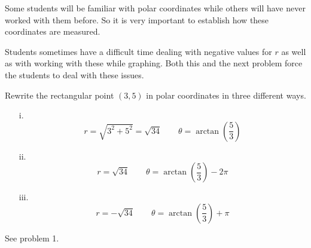 \documentclass[]{ximera}
\begin{document}
\begin{instructorNotes}
Some students will be familiar with polar coordinates while others will have never worked with them before.  
So it is very important to establish how these coordinates are measured.

Students sometimes have a difficult time dealing with negative values for $r$ as well as with working with these while graphing.  
Both this and the next problem force the students to deal with these issues.  
\end{instructorNotes}







\begin{problem}
Rewrite the rectangular point $(3,5)$ in polar coordinates in three different ways.
	\begin{freeResponse}
	\begin{enumerate}
	\item[i.]
		\[
		r = \sqrt{3^2 + 5^2} = \sqrt{34}	\qquad	\theta = \arctan \left( \frac{5}{3} \right)
		\]
		
	
	\item[ii.]
		\[
		r = \sqrt{34} 	\qquad	\theta = \arctan \left( \frac{5}{3} \right) - 2 \pi
		\]
		
	
	\item[iii.]
		\[
		r = - \sqrt{34}	\qquad	\theta = \arctan \left( \frac{5}{3} \right) + \pi
		\]
		
	
	\end{enumerate}
	\end{freeResponse}
		
\end{problem}

\begin{instructorNotes}
See problem 1.
\end{instructorNotes}
\end{document}
